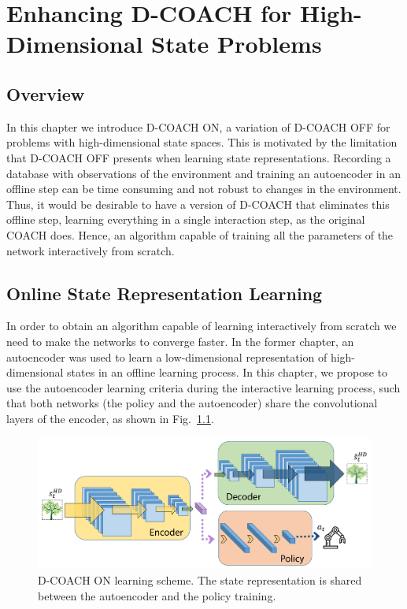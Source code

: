 \chapter{Enhancing D-COACH for High-Dimensional State Problems}
\section{Overview}

In this chapter we introduce  D-COACH ON, a variation of D-COACH OFF for problems with high-dimensional state spaces. This is motivated by the limitation that D-COACH OFF presents when learning state representations. Recording a database with observations of the environment and training an autoencoder in an offline step can be time consuming and not robust to changes in the environment. Thus, it would be desirable to have a version of D-COACH that eliminates this offline step, learning everything in a single interaction step, as the original COACH does. Hence, an algorithm capable of training all the parameters of the network interactively from scratch. 

\section{Online State Representation Learning}
In order to obtain an algorithm capable of learning interactively from scratch we need to make the networks to converge faster. In the former chapter, an autoencoder was used to learn a low-dimensional representation of high-dimensional states in an offline learning process. In this chapter, we propose to use the autoencoder learning criteria during the interactive learning process, such that both networks (the policy and the autoencoder) share the convolutional layers of the encoder, as shown in Fig.~\ref{fig:msim}.

\begin{figure}[H]
    \centering
    \includegraphics[width=\linewidth]{imagenes/cap2/m2.pdf}
    \caption[D-COACH ON learning scheme.]{D-COACH ON learning scheme. The state representation is shared between the autoencoder and the policy training.}
    \label{fig:msim}
\end{figure}

